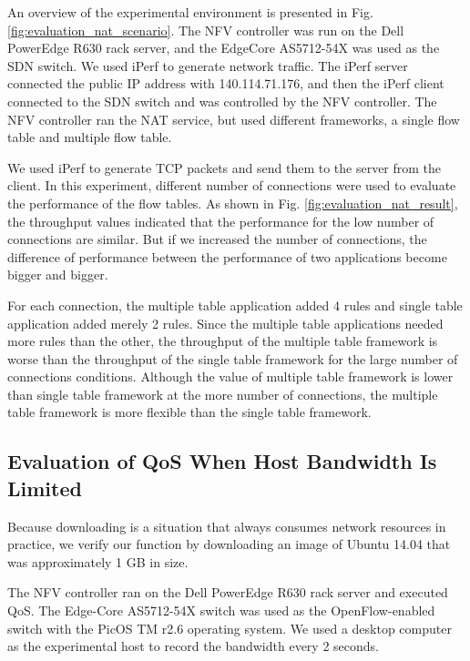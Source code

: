 \documentclass[conference]{IEEEtran}
\begin{document}
An overview of the experimental environment is presented in Fig. \ref{fig:evaluation_nat_scenario}. The NFV controller was run on the Dell PowerEdge R630 rack server, and the EdgeCore AS5712-54X \cite{edge-core-switch} was used as the SDN switch.
We used iPerf to generate network traffic. The iPerf server connected the public IP address with 140.114.71.176, and then the iPerf client connected to the SDN switch and was controlled by the NFV controller.
The NFV controller ran the NAT service, but used different frameworks, a single flow table and multiple flow table.

We used iPerf to generate TCP packets and send them to the server from the client.
In this experiment, different number of connections were used to evaluate the performance of the flow tables.
As shown in Fig. \ref{fig:evaluation_nat_result}, the throughput values indicated that the performance for the low number of connections are similar.
But if we increased the number of connections, the difference of performance between the performance of two applications become bigger and bigger.

For each connection, the multiple table application added 4 rules and single table application added merely 2 rules. Since the multiple table applications needed more rules than the other, the throughput of the multiple table framework is worse than the throughput of the single table framework for the large number of connections conditions.
Although the value of multiple table framework is lower than single table framework at the more number of connections, the multiple table framework is more flexible than the single table framework.



\subsection{Evaluation of QoS When Host Bandwidth Is Limited}

Because downloading is a situation that always consumes network resources in practice,
we verify our function by downloading an image of Ubuntu 14.04 that was approximately 1 GB in size.

The NFV controller ran on the Dell PowerEdge R630 rack server and executed QoS.
The Edge-Core AS5712-54X \cite{edge-core-switch} switch was used as the OpenFlow-enabled switch with the PicOS TM r2.6 operating system.
We used a desktop computer as the experimental host to record the bandwidth every 2 seconds.
\end{document}
